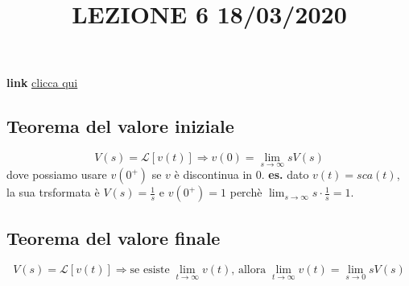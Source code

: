 \title{LEZIONE 6 18/03/2020}\newline
\textbf{link} \href{https://web.microsoftstream.com/video/0c2093a0-44b9-4c83-a0b1-7e61fbd111b5?list=user&userId=faa91214-a6f5-40d7-8875-253fd49b8ce1}{clicca qui}
\subsection{Teorema del valore iniziale}
\[
    V(s) = \mathcal{L}[v(t)] \Longrightarrow v(0) = \lim_{s\rightarrow \infty}s V(s)
\] 
dove possiamo usare $v(0^+)$ se $v$ è discontinua in $0$.\newline
\newline
\textbf{es.} dato $v(t) = sca(t)$, la sua trsformata è $V(s) = \frac{1}{s}$ e $v(0^+) = 1$ perchè $\lim_{s\rightarrow \infty}s \cdot \frac{1}{s} = 1$.
\subsection{Teorema del valore finale}
\[
    V(s) = \mathcal{L}[v(t)] \Longrightarrow \text{se esiste}\; \lim_{t\rightarrow \infty} v(t) \text{, allora}\;\lim_{t\rightarrow \infty} v(t) = \lim_{s\rightarrow 0}sV(s)
\]
